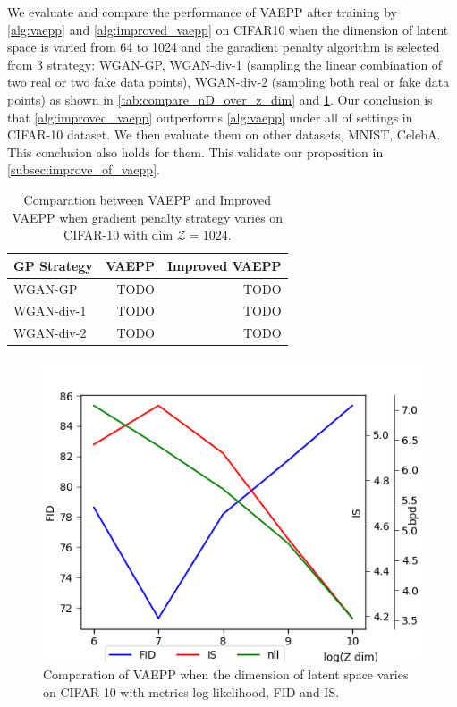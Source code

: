 We evaluate and compare the performance of VAEPP after training by \cref{alg:vaepp} and \cref{alg:improved_vaepp} on CIFAR10 when the dimension of latent space is varied from 64 to 1024 and the garadient penalty algorithm is selected from 3 strategy: WGAN-GP, WGAN-div-1  (sampling the linear combination of two real or two fake data points), WGAN-div-2 (sampling both real or fake data points) as shown in \cref{tab:compare_nD_over_z_dim} and \cref{tab:compare_nD_over_R}. Our conclusion is that \cref{alg:improved_vaepp} outperforms \cref{alg:vaepp} under all of settings in CIFAR-10 dataset. We then evaluate them on other datasets, MNIST, CelebA. This conclusion also holds for them. This validate our proposition in \cref{subsec:improve_of_vaepp}. 
\begin{table}[tb]
\centering
\begin{tabular}{lrr}  
\toprule
GP Strategy  &  VAEPP  &  Improved VAEPP \\
\midrule
WGAN-GP            &  TODO   & TODO      \\
WGAN-div-1         &  TODO   & TODO      \\
WGAN-div-2         &  TODO   & TODO      \\
\bottomrule
\end{tabular}
\caption{Comparation between VAEPP and Improved VAEPP when gradient penalty strategy varies on CIFAR-10 with dim $\mathcal{Z} = 1024$. }
\label{tab:compare_nD_over_R}
\end{table}

\begin{figure}
	\centering
	\includegraphics[width=\columnwidth]{../figures/fid_is_nll_on_different_dim}
	\caption{
	Comparation of VAEPP when the dimension of latent space varies on CIFAR-10 with metrics log-likelihood, FID and IS.
	}
	\label{fig:compare_nD_over_z_dim}
\end{figure}

